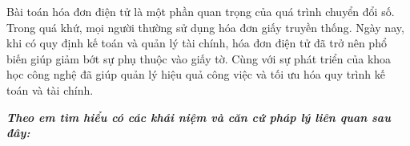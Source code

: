 Bài toán hóa đơn điện tử là một phần quan trọng của quá trình chuyển đổi số. Trong quá khứ, mọi người thường sử dụng hóa đơn giấy truyền thống. Ngày nay, khi có quy định kế toán và quản lý tài chính, hóa đơn điện tử đã trở nên phổ biến giúp giảm bớt sự phụ thuộc vào giấy tờ. Cùng với sự phát triển của khoa học công nghệ đã giúp quản lý hiệu quả công việc và tối ưu hóa quy trình kế toán và tài chính.

\textbf{\textit{Theo em tìm hiểu có các khái niệm và căn cứ pháp lý liên quan sau đây:}}